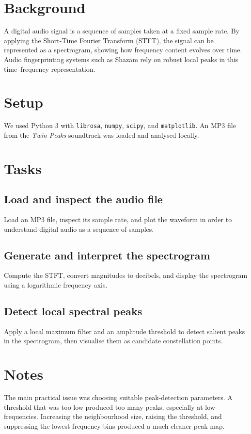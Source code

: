 \documentclass[12pt]{article}
\begin{document}
\section{Background}
A digital audio signal is a sequence of samples taken at a fixed sample rate.  
By applying the Short-Time Fourier Transform (STFT), 
the signal can be represented as a spectrogram, 
showing how frequency content evolves over time.  
Audio fingerprinting systems such as Shazam rely 
on robust local peaks in this time--frequency representation.


\section{Setup}

We used Python 3 with \texttt{librosa}, \texttt{numpy}, \texttt{scipy}, and \texttt{matplotlib}.  
An MP3 file from the \textit{Twin Peaks} soundtrack was loaded and analysed locally.

\section{Tasks}

\subsection{Load and inspect the audio file}

Load an MP3 file, inspect its sample rate, and plot the waveform in order to understand digital audio as a sequence of samples.

\subsection{Generate and interpret the spectrogram}

Compute the STFT, convert magnitudes to decibels, and display the spectrogram using a logarithmic frequency axis.

\subsection{Detect local spectral peaks}

Apply a local maximum filter and an amplitude threshold to detect salient peaks in the spectrogram, then visualise them as candidate constellation points.

\section{Notes}

The main practical issue was choosing suitable peak-detection parameters.  
A threshold that was too low produced too many peaks, especially at low frequencies.  
Increasing the neighbourhood size, raising the threshold, and suppressing the lowest frequency bins produced a much cleaner peak map.
\end{document}
